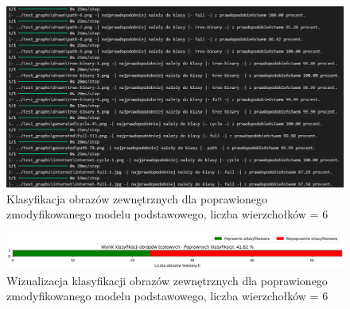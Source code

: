 \begin{figure}[ht]
	\centering
	\includegraphics[width=14cm]{resources/tests/images/v4/base6_1_1_txt.png}
	\caption{Klasyfikacja obrazów zewnętrznych dla poprawionego zmodyfikowanego modelu podstawowego, liczba wierzchołków = 6}
	\label{Fig:tests-base-6b}
\end{figure}
\FloatBarrier

\begin{figure}[ht]
	\centering
	\includegraphics[width=14cm]{resources/tests/images/v4/base6_1_1_bar.png}
	\caption{Wizualizacja klasyfikacji obrazów zewnętrznych dla poprawionego zmodyfikowanego modelu podstawowego, liczba wierzchołków = 6}
	\label{Fig:tests-base-6c}
\end{figure}
\FloatBarrier


